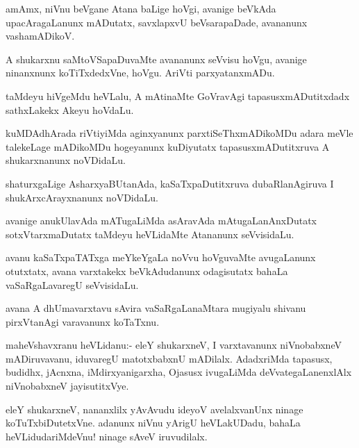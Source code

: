 \documentclass{article}
\begin{document}
\begin{mn}
amAmx, niVnu beVgane Atana baLige hoVgi, avanige beVkAda
upacAragaLanunx mADutatx, savxlapxvU beVsarapaDade, avananunx vashamADikoV.
\end{mn}

\begin{mn}
A shukarxnu saMtoVSapaDuvaMte avananunx seVvisu hoVgu, avanige
ninanxnunx koTiTxdedxVne, hoVgu. AriVti parxyatanxmADu.
\end{mn}

\begin{mn}
taMdeyu hiVgeMdu heVLalu, A mAtinaMte GoVravAgi tapasusxmADutitxdadx
sathxLakekx Akeyu hoVdaLu.
\end{mn}

\begin{mn}
kuMDAdhArada riVtiyiMda aginxyanunx parxtiSeThxmADikoMDu adara meVle
talekeLage mADikoMDu hogeyanunx kuDiyutatx tapasusxmADutitxruva A
shukarxnanunx noVDidaLu.
\end{mn}

\begin{mn}
shaturxgaLige AsharxyaBUtanAda, kaSaTxpaDutitxruva dubaRlanAgiruva I
shukArxcArayxnanunx noVDidaLu.
\end{mn}

\begin{mn}
avanige anukUlavAda mATugaLiMda asAravAda mAtugaLanAnxDutatx
sotxVtarxmaDutatx taMdeyu heVLidaMte Atananunx seVvisidaLu.
\end{mn}

\begin{mn}
avanu kaSaTxpaTATxga meYkeYgaLa noVvu hoVguvaMte avugaLanunx
otutxtatx, avana varxtakekx beVkAdudanunx odagisutatx bahaLa
vaSaRgaLavaregU seVvisidaLu.
\end{mn}

\begin{mn}%
avana A dhUmavarxtavu sAvira vaSaRgaLanaMtara mugiyalu shivanu
pirxVtanAgi varavanunx koTaTxnu.
\end{mn}

\begin{mn}
maheVshavxranu heVLidanu:- eleY shukarxneV, I varxtavanunx
niVnobabxneV mADiruvavanu, iduvaregU matotxbabxnU mADilalx. AdadxriMda
tapasusx, budidhx, jAcnxna, iMdirxyanigarxha, Ojasusx ivugaLiMda
deVvategaLanenxlAlx niVnobabxneV jayisutitxVye.
\end{mn}

\begin{mn}
eleY shukarxneV, nananxlilx yAvAvudu ideyoV avelalxvanUnx ninage
koTuTxbiDutetxVne. adanunx niVnu yArigU heVLakUDadu, bahaLa
heVLidudariMdeVnu! ninage sAveV iruvudilalx.
\end{mn}
\end{document}
